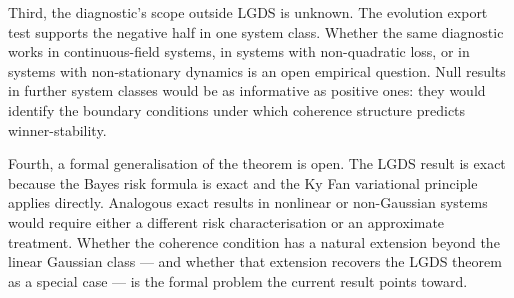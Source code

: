\documentclass[11pt]{article}
\begin{document}
Third, the diagnostic's scope outside LGDS is unknown.
The evolution export test supports the negative half in one system class.
Whether the same diagnostic works in continuous-field systems,
in systems with non-quadratic loss, or in systems with non-stationary
dynamics is an open empirical question.
Null results in further system classes would be as informative as positive
ones: they would identify the boundary conditions under which coherence
structure predicts winner-stability.

Fourth, a formal generalisation of the theorem is open.
The LGDS result is exact because the Bayes risk formula is exact and the
Ky Fan variational principle applies directly.
Analogous exact results in nonlinear or non-Gaussian systems would require
either a different risk characterisation or an approximate treatment.
Whether the coherence condition has a natural extension beyond the linear
Gaussian class --- and whether that extension recovers the LGDS theorem as
a special case --- is the formal problem the current result points toward.




\end{document}
